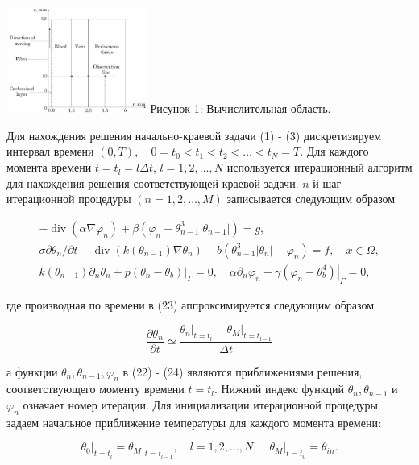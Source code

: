 \includegraphics[height=3.5cm]{images/6_chebotarev.jpg}
Рисунок 1: Вычислительная область.

Для нахождения решения начально-краевой задачи (1) - (3) дискретизируем
интервал времени $(0, T), \quad 0=t_{0}<t_{1}<t_{2}< \ldots<t_{N}=T$.
Для каждого момента времени $t=t_{l}=l \Delta t$, $l=1,2, \ldots, N$
используется итерационный алгоритм для нахождения решения соответствующей краевой задачи.
$n$-й шаг итерационной процедуры $(n=1,2,\ldots,M)$ записывается следующим образом

\[
    \begin{gathered}
        -\operatorname{div}\left(\alpha \nabla \varphi_{n}\right)
        +\beta\left(\varphi_{n}-\theta_{n-1}^{3}\left|\theta_{n-1}\right|\right)=g, \\
        \sigma \partial \theta_{n} / \partial t
        -\operatorname{div}\left(k\left(\theta_{n-1}\right) \nabla \theta_{n}\right)
        -b\left(\theta_{n-1}^{3}\left|\theta_{n}\right|-\varphi_{n}\right)=f, \quad x \in \Omega, \\
        k\left(\theta_{n-1}\right) \partial_{n} \theta_{n}+
        \left.p\left(\theta_{n}-\theta_{b}\right)\right|_{\Gamma}=0,
        \quad \alpha \partial_{n} \varphi_{n}+\left.\gamma\left(\varphi_{n}-\theta_{b}^{4}\right)\right|_{\Gamma}=0,
    \end{gathered}
\]


где производная по времени в (23) аппроксимируется следующим образом

\[
    \frac{\partial \theta_{n}}{\partial t} \simeq \frac{\left.\theta_{n}\right|_{t=t_{l}}
        -\left.\theta_{M}\right|_{t=t_{l-1}}}{\Delta t}
\]

а функции $\theta_{n}, \theta_{n-1}, \varphi_{n}$ в (22) - (24) являются приближениями решения,
соответствующего моменту времени $t=t_{l}$.
Нижний индекс функций $\theta_{n}, \theta_{n-1}$ и $\varphi_{n}$ означает номер итерации.
Для инициализации итерационной процедуры задаем начальное приближение температуры для каждого момента времени:

\[
    \left.\theta_{0}\right|_{t=t_{l}}=\left.\theta_{M}\right|_{t=t_{l-1}},
    \quad l=1,2, \ldots, N,\left.\quad \theta_{M}\right|_{t=t_{0}}=\theta_{i n}.
\]


